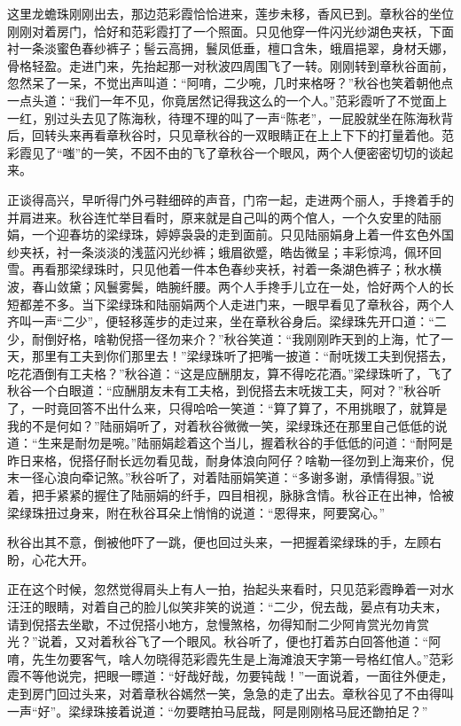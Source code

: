 \documentclass[12pt,UTF8]{ctexbook}
\begin{document}
{{{这里龙蟾珠刚刚出去，那边范彩霞恰恰进来，莲步未移，香风已到。章秋谷的坐位刚刚对着房门，恰好和范彩霞打了一个照面。只见他穿一件闪光纱湖色夹袄，下面衬一条淡蜜色春纱裤子；髻云高拥，鬟凤低垂，檀口含朱，蛾眉挹翠，身材夭娜，骨格轻盈。走进门来，先抬起那一对秋波四周围飞了一转。刚刚转到章秋谷面前，忽然呆了一呆，不觉出声叫道：“阿唷，二少啘，几时来格呀？”秋谷也笑着朝他点一点头道：“我们一年不见，你竟居然记得我这么的一个人。”范彩霞听了不觉面上一红，别过头去见了陈海秋，待理不理的叫了一声“陈老”，一屁股就坐在陈海秋背后，回转头来再看章秋谷时，只见章秋谷的一双眼睛正在上上下下的打量着他。范彩霞见了“嗤”的一笑，不因不由的飞了章秋谷一个眼风，两个人便密密切切的谈起来。

正谈得高兴，早听得门外弓鞋细碎的声音，门帘一起，走进两个丽人，手搀着手的并肩进来。秋谷连忙举目看时，原来就是自己叫的两个倌人，一个久安里的陆丽娟，一个迎春坊的梁绿珠，婷婷袅袅的走到面前。只见陆丽娟身上着一件玄色外国纱夹袄，衬一条淡淡的浅蓝闪光纱裤；蛾眉欲蹙，皓齿微呈；丰彩惊鸿，佩环回雪。再看那梁绿珠时，只见他着一件本色春纱夹袄，衬着一条湖色裤子；秋水横波，春山敛黛；风鬟雾鬓，皓腕纤腰。两个人手搀手儿立在一处，恰好两个人的长短都差不多。当下梁绿珠和陆丽娟两个人走进门来，一眼早看见了章秋谷，两个人齐叫一声“二少”，便轻移莲步的走过来，坐在章秋谷身后。梁绿珠先开口道：“二少，耐倒好格，啥勒倪搭一径勿来介？”秋谷笑道：“我刚刚昨天到的上海，忙了一天，那里有工夫到你们那里去！”梁绿珠听了把嘴一披道：“耐呒拨工夫到倪搭去，吃花酒倒有工夫格？”秋谷道：“这是应酬朋友，算不得吃花酒。”梁绿珠听了，飞了秋谷一个白眼道：“应酬朋友未有工夫格，到倪搭去末呒拨工夫，阿对？”秋谷听了，一时竟回答不出什么来，只得哈哈一笑道：“算了算了，不用挑眼了，就算是我的不是何如？”陆丽娟听了，对着秋谷微微一笑，梁绿珠还在那里自己低低的说道：“生来是耐勿是啘。”陆丽娟趁着这个当儿，握着秋谷的手低低的问道：“耐阿是昨日来格，倪搭仔耐长远勿看见哉，耐身体浪向阿仔？啥勒一径勿到上海来价，倪末一径心浪向牵记煞。”秋谷听了，对着陆丽娟笑道：“多谢多谢，承情得狠。”说着，把手紧紧的握住了陆丽娟的纤手，四目相视，脉脉含情。秋谷正在出神，恰被梁绿珠扭过身来，附在秋谷耳朵上悄悄的说道：“恩得来，阿要窝心。”

秋谷出其不意，倒被他吓了一跳，便也回过头来，一把握着梁绿珠的手，左顾右盼，心花大开。

正在这个时候，忽然觉得肩头上有人一拍，抬起头来看时，只见范彩霞睁着一对水汪汪的眼睛，对着自己的脸儿似笑非笑的说道：“二少，倪去哉，晏点有功夫末，请到倪搭去坐歇，不过倪搭小地方，怠慢煞格，勿得知耐二少阿肯赏光勿肯赏光？”说着，又对着秋谷飞了一个眼风。秋谷听了，便也打着苏白回答他道：“阿唷，先生勿要客气，啥人勿晓得范彩霞先生是上海滩浪天字第一号格红倌人。”范彩霞不等他说完，把眼一瞟道：“好哉好哉，勿要钝哉！”一面说着，一面往外便走，走到房门回过头来，对着章秋谷嫣然一笑，急急的走了出去。章秋谷见了不由得叫一声“好”。梁绿珠接着说道：“勿要瞎拍马屁哉，阿是刚刚格马屁还朆拍足？”

}}}
\end{document}
